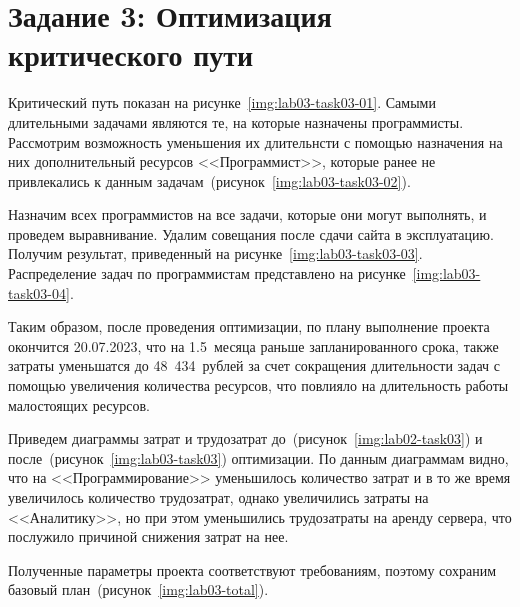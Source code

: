\section{Задание 3: Оптимизация критического пути }

Критический путь показан на рисунке~\ref{img:lab03-task03-01}. Самыми
длительными задачами являются те, на которые назначены программисты. Рассмотрим
возможность уменьшения их длительнсти с помощью назначения на них
дополнительный ресурсов <<Программист>>, которые ранее не привлекались к данным
задачам~(рисунок~\ref{img:lab03-task03-02}).



Назначим всех программистов на все задачи, которые они могут выполнять, и
проведем выравнивание. Удалим совещания после сдачи сайта в эксплуатацию.
Получим результат, приведенный на рисунке~\ref{img:lab03-task03-03}.
Распределение задач по программистам представлено на
рисунке~\ref{img:lab03-task03-04}.



Таким образом, после проведения оптимизации, по плану выполнение проекта
окончится 20.07.2023, что на 1.5~месяца раньше запланированного срока, также
затраты уменьшатся до 48~434~рублей за счет сокращения длительности задач с
помощью увеличения количества ресурсов, что повлияло на длительность работы
малостоящих ресурсов.

Приведем диаграммы затрат и трудозатрат до~(рисунок~\ref{img:lab02-task03}) и
после~(рисунок~\ref{img:lab03-task03}) оптимизации.  По данным диаграммам
видно, что на <<Программирование>> уменьшилось количество затрат и в то же
время увеличилось количество трудозатрат, однако увеличились затраты на
<<Аналитику>>, но при этом уменьшились трудозатраты на аренду сервера, что
послужило причиной снижения затрат на нее.



Полученные параметры проекта соответствуют требованиям, поэтому сохраним
базовый план~(рисунок~\ref{img:lab03-total}).

